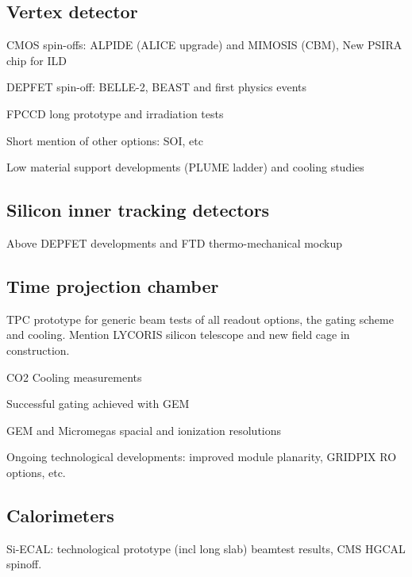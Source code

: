 \vspace{2cm}
\subsection{Vertex detector}

CMOS spin-offs: ALPIDE (ALICE upgrade) and MIMOSIS (CBM), New PSIRA chip for ILD

DEPFET spin-off: BELLE-2, BEAST and first physics events

FPCCD long prototype and irradiation tests

Short mention of other options:  SOI, etc

Low material support developments (PLUME ladder) and cooling studies

\vspace{2cm}
\subsection{Silicon inner tracking detectors}

Above DEPFET developments and FTD thermo-mechanical mockup

\vspace{2cm}
\subsection{Time projection chamber}

TPC prototype for generic beam tests of all readout options, the gating scheme and cooling. Mention LYCORIS silicon telescope and new field cage in construction.

CO2 Cooling measurements            

Successful gating achieved with GEM

GEM and Micromegas spacial and ionization resolutions

Ongoing technological developments: improved module planarity, GRIDPIX RO options, etc.  

\vspace{2cm}
\subsection{Calorimeters}

Si-ECAL: technological prototype (incl long slab) beamtest results, CMS HGCAL spinoff.

